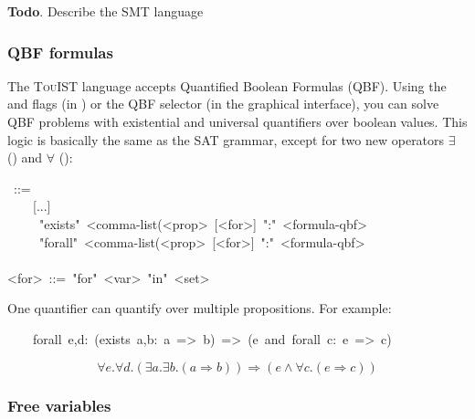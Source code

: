 {\noindent\textbf{Todo}.
Describe the SMT language%

\subsubsection{QBF formulas}\label{sec-qbf-formulas}%

\noindent The {\scshape TouIST} language accepts Quantified Boolean Formulas (QBF). Using
the  and  flags (in ) or the QBF selector (in the
graphical interface), you can solve QBF problems with existential and
universal quantifiers over boolean values. This logic is basically the
same as the SAT grammar, except for two new operators $\exists$
() and $\forall$ ():%
\begin{mdpre}%
~::=\\
~~~~{}[...]\\
~~~~\textbar{}~"exists"~{\textless{}comma-list(\textless{}prop\textgreater{}}~{}[{\textless{}for\textgreater{}}]~":"~{\textless{}formula-qbf\textgreater{}}\\
~~~~\textbar{}~"forall"~{\textless{}comma-list(\textless{}prop\textgreater{}}~{}[{\textless{}for\textgreater{}}]~":"~{\textless{}formula-qbf\textgreater{}}\\
\\
{\textless{}for\textgreater{}}~::=~"for"~{\textless{}var\textgreater{}}~"in"~{\textless{}set\textgreater{}}%
\end{mdpre}\noindent One quantifier can quantify over multiple propositions. For example:
\begin{mdpre}%
\noindent~~~~{forall}~e,d:~({exists}~a,b:~a~=\textgreater{}~b)~=\textgreater{}~(e~and~{forall}~c:~e~=\textgreater{}~c)%
\end{mdpre}\noindent\noindent\[\forall e. \forall d. (\exists a. \exists b. (a \Rightarrow b)) \Rightarrow (e \wedge \forall c. (e \Rightarrow c))
\]%

\subsubsection{Free variables}\label{sec-free-variables}%

}
